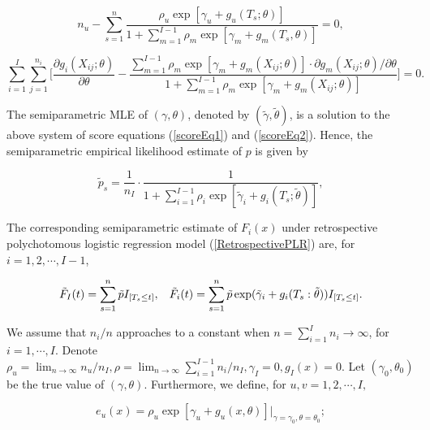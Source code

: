 \documentclass[12]{interact}
\theoremstyle{plain}%
\theoremstyle{definition}
\theoremstyle{remark}
\begin{document}
\begin{equation}
	n_u -\sum_{s=1}^n \frac{\rho_u\exp[\gamma_u+g_u(T_s;\theta)]} {1+\sum_{m=1}^{I-1}\rho_m\exp[\gamma_m+g_m(T_s,\theta)]}=0,
	\label{scoreEq1}
\end{equation}

\begin{equation}
	\sum_{i=1}^{I}\sum_{j=1}^{n_i}\Big[ \frac{\partial g_i(X_{ij};\theta)}{\partial
		\theta}-\frac{\sum_{m=1}^{I-1}\rho_m\exp[\gamma_m+g_m(X_{ij};\theta)]\cdot
		\partial g_m(X_{ij};\theta)/\partial\theta}{1+\sum_{m=1}^{I-1}\rho_m\exp[\gamma_m
		+g_m(X_{ij};\theta)]} \Big]=0 .  \label{scoreEq2}
\end{equation}

The semiparametric MLE of $(\gamma, \theta)$, denoted by $(\tilde{\gamma}, \tilde{\theta})$, is a solution to the above system of score equations (\ref{scoreEq1}) and (\ref{scoreEq2}). Hence, the semiparametric empirical likelihood estimate of $p$ is given by

\begin{equation}
	\tilde{p}_s=\frac{1}{n_I}\cdot\frac{1}{1+\sum_{i=1}^{I-1}\rho_i\exp[\tilde{\gamma}_i+ g_i(T_s;\tilde{\theta})]},\label{p_el_mle}
\end{equation}

The corresponding semiparametric estimate of $F_i(x)$ under retrospective polychotomous logistic regression model (\ref{RetrospectivePLR}) are, for $i=1, 2, \cdots, I-1$,

\begin{equation}
	\tilde{F}_I(t)=\sum_{s=1}^n\tilde{p}I_{[T_s\le t]},\hspace{3mm}\tilde{F}_i(t)=\sum_{s=1}^n\tilde{p}\exp(\tilde{\gamma}_i+g_i(T_s:\tilde{\theta}))I_{[T_s\le t]}. \label{ELMLE_F_i}
\end{equation}

We assume that $n_i/n$ approaches to a constant when $n=\sum_{i=1}^I n_i \rightarrow \infty$, for $i=1,\cdots, I$.
Denote $ \rho_u=\lim_{n\rightarrow \infty} n_u/n_I, \rho =\lim_{n\rightarrow \infty} \sum_{i=1}^{I-1} n_i/n_I, \gamma_I=0, g_I(x)=0$. Let $(\gamma_0, \theta_0)$ be the true value of $(\gamma, \theta)$. Furthermore, we define, for $u, v = 1, 2,\cdots, I,$

\begin{equation}
	e_{u}(x)=\rho_u\exp[\gamma_{u}+ g_u(x,\theta)]\Big|_{\scriptstyle\gamma=\gamma_0 , \scriptstyle\theta=\theta_0};\label{e_u}
\end{equation}
\end{document}
